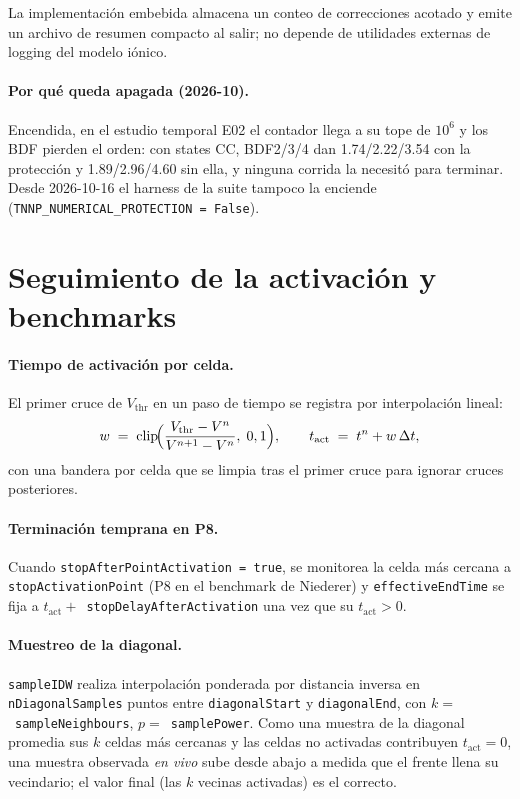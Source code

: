 \documentclass[11pt,a4paper]{article}
\newcommand{\code}[1]{\texttt{\small #1}}
\begin{document}
La implementación embebida almacena un conteo de correcciones acotado y emite un
archivo de resumen compacto al salir; no depende de utilidades externas de logging
del modelo iónico.

\paragraph{Por qué queda apagada (2026-10).} Encendida, en el estudio temporal E02
el contador llega a su tope de $10^6$ y los BDF pierden el orden: con states CC,
BDF2/3/4 dan 1.74/2.22/3.54 con la protección y 1.89/2.96/4.60 sin ella, y ninguna
corrida la necesitó para terminar. Desde 2026-10-16 el harness de la suite tampoco
la enciende (\code{TNNP\_NUMERICAL\_PROTECTION = False}).

\section{Seguimiento de la activación y benchmarks}

\paragraph{Tiempo de activación por celda.}
El primer cruce de $V_{\text{thr}}$ en un paso de tiempo se registra por
interpolación lineal:
\begin{equation}
  w \;=\; \mathrm{clip}\!\Bigl(
      \frac{V_{\text{thr}} - V^{n}}{V^{n+1} - V^{n}},
      \; 0, 1
    \Bigr),
   \qquad
   t_{\text{act}} \;=\; t^{n} + w\, \Delta t,
\end{equation}
con una bandera por celda que se limpia tras el primer cruce para ignorar cruces
posteriores.

\paragraph{Terminación temprana en P8.}
Cuando \code{stopAfterPointActivation = true}, se monitorea la celda más cercana a
\code{stopActivationPoint} (P8 en el benchmark de Niederer) y \code{effectiveEndTime}
se fija a $t_{\text{act}} + $~\code{stopDelayAfterActivation} una vez que su
$t_{\text{act}} > 0$.

\paragraph{Muestreo de la diagonal.}
\code{sampleIDW} realiza interpolación ponderada por distancia inversa en
\code{nDiagonalSamples} puntos entre \code{diagonalStart} y \code{diagonalEnd}, con
$k = $~\code{sampleNeighbours}, $p = $~\code{samplePower}. Como una muestra de la
diagonal promedia sus $k$ celdas más cercanas y las celdas no activadas contribuyen
$t_{\text{act}}=0$, una muestra observada \emph{en vivo} sube desde abajo a medida
que el frente llena su vecindario; el valor final (las $k$ vecinas activadas) es el
correcto.
\end{document}
